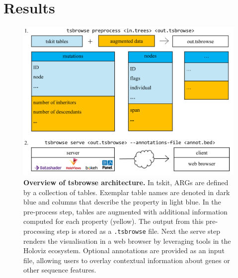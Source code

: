 \documentclass[unnumsec,webpdf,contemporary,large,namedate]{oup-authoring-template}%
\begin{document}




\section{Results} 

\begin{figure} \centering
\includegraphics[width=0.95\linewidth]{figures/MainFig1.png}
\caption{\textbf{Overview of tsbrowse architecture. } In tskit, ARGs are
defined by a collection of tables. Exemplar
table names are denoted in dark blue and columns that describe the property in
light blue. In the pre-process step, tables are augmented with additional
information computed for each property (yellow). The output from this
pre-processing step is stored as a \texttt{.tsbrowse} file. Next the serve step
renders the visualisation in a web browser by leveraging tools in the Holoviz
ecosystem. Optional annotations are provided as an input file, allowing users
to overlay contextual information about genes or other sequence features. }
\label{fig:Figure_1} \end{figure}
\end{document}
